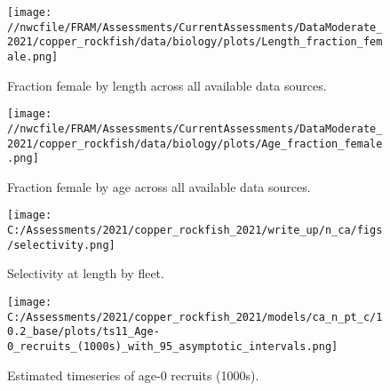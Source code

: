 \documentclass[11pt,
  english,
  a4paper,
]{article}
\begin{document}
\tagmcend\tagstructend

\clearpage


\begin{figure}
\centering
\texttt{[image: //nwcfile/FRAM/Assessments/CurrentAssessments/DataModerate\_2021/copper\_rockfish/data/biology/plots/Length\_fraction\_female.png]}
\caption{Fraction female by length across all available data sources.\label{fig:len-sex-ratio}}
\end{figure}

\tagmcend\tagstructend


\begin{figure}
\centering
\texttt{[image: //nwcfile/FRAM/Assessments/CurrentAssessments/DataModerate\_2021/copper\_rockfish/data/biology/plots/Age\_fraction\_female.png]}
\caption{Fraction female by age across all available data sources.\label{fig:age-sex-ratio}}
\end{figure}

\tagmcend\tagstructend


\begin{figure}
\centering
\texttt{[image: C:/Assessments/2021/copper\_rockfish\_2021/write\_up/n\_ca/figs/selectivity.png]}
\caption{Selectivity at length by fleet.\label{fig:selex}}
\end{figure}

\tagmcend\tagstructend


\begin{figure}
\centering
\texttt{[image: C:/Assessments/2021/copper\_rockfish\_2021/models/ca\_n\_pt\_c/10.2\_base/plots/ts11\_Age-0\_recruits\_(1000s)\_with\_95\_asymptotic\_intervals.png]}
\caption{Estimated timeseries of age-0 recruits (1000s).\label{fig:recruits}}
\end{figure}

\tagmcend\tagstructend
\end{document}

